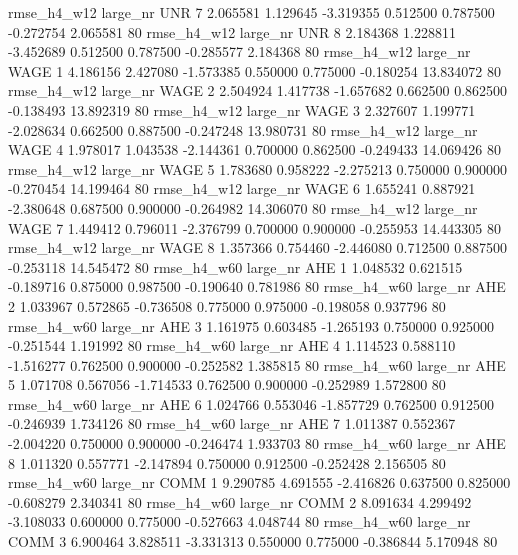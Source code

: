  rmse_h4_w12   large_nr      UNR                 7  2.065581  1.129645  -3.319355 0.512500 0.787500 -0.272754    2.065581 80
 rmse_h4_w12   large_nr      UNR                 8  2.184368  1.228811  -3.452689 0.512500 0.787500 -0.285577    2.184368 80
 rmse_h4_w12   large_nr     WAGE                 1  4.186156  2.427080  -1.573385 0.550000 0.775000 -0.180254   13.834072 80
 rmse_h4_w12   large_nr     WAGE                 2  2.504924  1.417738  -1.657682 0.662500 0.862500 -0.138493   13.892319 80
 rmse_h4_w12   large_nr     WAGE                 3  2.327607  1.199771  -2.028634 0.662500 0.887500 -0.247248   13.980731 80
 rmse_h4_w12   large_nr     WAGE                 4  1.978017  1.043538  -2.144361 0.700000 0.862500 -0.249433   14.069426 80
 rmse_h4_w12   large_nr     WAGE                 5  1.783680  0.958222  -2.275213 0.750000 0.900000 -0.270454   14.199464 80
 rmse_h4_w12   large_nr     WAGE                 6  1.655241  0.887921  -2.380648 0.687500 0.900000 -0.264982   14.306070 80
 rmse_h4_w12   large_nr     WAGE                 7  1.449412  0.796011  -2.376799 0.700000 0.900000 -0.255953   14.443305 80
 rmse_h4_w12   large_nr     WAGE                 8  1.357366  0.754460  -2.446080 0.712500 0.887500 -0.253118   14.545472 80
 rmse_h4_w60   large_nr      AHE                 1  1.048532  0.621515  -0.189716 0.875000 0.987500 -0.190640    0.781986 80
 rmse_h4_w60   large_nr      AHE                 2  1.033967  0.572865  -0.736508 0.775000 0.975000 -0.198058    0.937796 80
 rmse_h4_w60   large_nr      AHE                 3  1.161975  0.603485  -1.265193 0.750000 0.925000 -0.251544    1.191992 80
 rmse_h4_w60   large_nr      AHE                 4  1.114523  0.588110  -1.516277 0.762500 0.900000 -0.252582    1.385815 80
 rmse_h4_w60   large_nr      AHE                 5  1.071708  0.567056  -1.714533 0.762500 0.900000 -0.252989    1.572800 80
 rmse_h4_w60   large_nr      AHE                 6  1.024766  0.553046  -1.857729 0.762500 0.912500 -0.246939    1.734126 80
 rmse_h4_w60   large_nr      AHE                 7  1.011387  0.552367  -2.004220 0.750000 0.900000 -0.246474    1.933703 80
 rmse_h4_w60   large_nr      AHE                 8  1.011320  0.557771  -2.147894 0.750000 0.912500 -0.252428    2.156505 80
 rmse_h4_w60   large_nr     COMM                 1  9.290785  4.691555  -2.416826 0.637500 0.825000 -0.608279    2.340341 80
 rmse_h4_w60   large_nr     COMM                 2  8.091634  4.299492  -3.108033 0.600000 0.775000 -0.527663    4.048744 80
 rmse_h4_w60   large_nr     COMM                 3  6.900464  3.828511  -3.331313 0.550000 0.775000 -0.386844    5.170948 80
